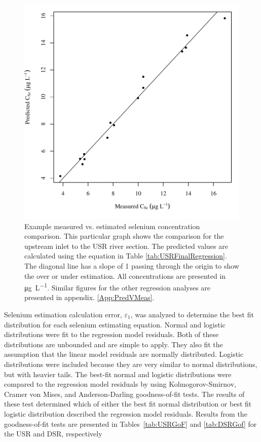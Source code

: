 \begin{linenumbers}
\begin{figure}[htbp]
	\begin{center}
		\includegraphics[width=6in]{"Figures/Results_USR/Conc Model pred v meas U163"}
		\caption[Example measured vs. estimated selenium concentration comparison.]{Example measured vs. estimated selenium concentration comparison.  This particular graph shows the comparison for the upstream inlet to the USR river section.  The predicted values are calculated using the equation in Table \ref{tab:USRFinalRegression}.  The diagonal line has a slope of 1 passing through the origin to show the over or under estimation.  All concentrations are presented in \si{\micro\gram\per\liter}.  Similar figures for the other regression analyses are presented in appendix. \ref{App:PredVMeas}.}
	\label{fig:ExamplePredVMeas}
	\end{center}
\end{figure}

Selenium estimation calculation error, $\varepsilon_{1}$, was analyzed to determine the best fit distribution for each selenium estimating equation.  Normal and logistic distributions were fit to the regression model residuals.  Both of these distributions are unbounded and are simple to apply.  They also fit the assumption that the linear model residuals are normally distributed.  Logistic distributions were included because they are very similar to normal distributions, but with heavier tails.  The best-fit normal and logistic distributions were compared to the regression model residuals by using Kolmogorov-Smirnov, Cramer von Mises, and Anderson-Darling goodness-of-fit tests.  The results of these test determined which of either the best fit normal distribution or best fit logistic distribution described the regression model residuals.  Results from the goodness-of-fit tests are presented in Tables~\ref{tab:USRGoF} and \ref{tab:DSRGof} for the USR and DSR, respectively


\end{linenumbers}
